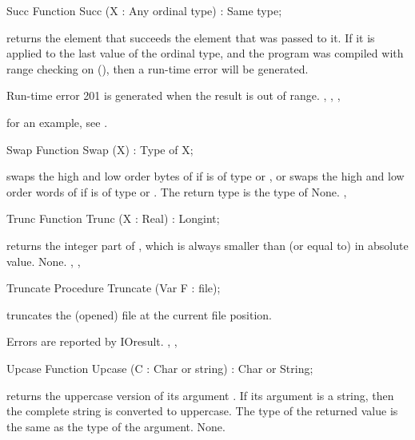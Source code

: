 
\begin{function}{Succ}
\Declaration
Function Succ (X : Any ordinal type) : Same type;

\Description
  returns the element that succeeds the element that was passed
to it. If it is applied to the last value of the ordinal type, and the
program was compiled with range checking on (), then a run-time
error will be generated.

\Errors
Run-time error 201 is generated when the result is out of
range.
\SeeAlso
{}, , , 
\end{function}
for an example, see .
\begin{function}{Swap}
\Declaration
Function Swap (X) : Type of X;

\Description
{} swaps the high and low order bytes of  if  is of
type  or , or swaps the high and low order words of
 if  is of type  or .
The return type is the type of 
\Errors
None.
\SeeAlso
{}, 
\end{function}


\begin{function}{Trunc}
\Declaration
Function Trunc (X : Real) : Longint;

\Description
{} returns the integer part of ,
which is always smaller than (or equal to)  in absolute value.
\Errors
None.
\SeeAlso
{}, , 
\end{function}


\begin{procedure}{Truncate}
\Declaration
Procedure Truncate (Var F : file);

\Description
{} truncates the (opened) file  at the current file
position.

\Errors
Errors are reported by IOresult.
\SeeAlso
{}, ,
\end{procedure}


\begin{function}{Upcase}
\Declaration
Function Upcase (C : Char or string) : Char or String;

\Description
{} returns the uppercase version of its argument .
If its argument is a string, then the complete string is converted to
uppercase. The type of the returned value is the same as the type of the
argument.
\Errors
None.
\SeeAlso
{}
\end{function}

